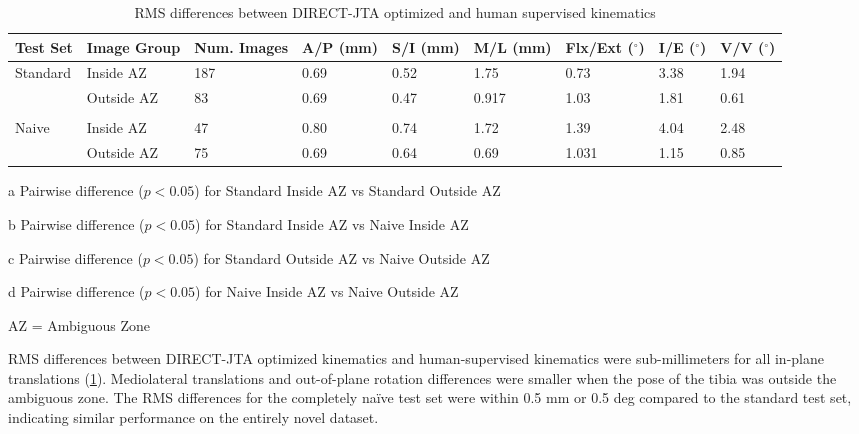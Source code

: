 {\begin{landscape}
	\begin{table}[h!]
		\centering
		\caption{RMS differences between DIRECT-JTA optimized and human supervised kinematics}
		\label{tab:direct-rms}
		\begin{threeparttable}
			\begin{tabularx}{\linewidth}{XXXXXXXXX}
				\hline
				Test Set                  & Image Group & Num. Images & A/P (mm) & S/I (mm)      & M/L (mm)      & Flx/Ext ($^{\circ}$) & I/E ($^{\circ}$) & V/V ($^{\circ}$) \\ %
				\hline
				\multirow{2}{*}{Standard} & Inside AZ   & 187         & 0.69     & 0.52\tnote{b} & 1.75\tnote{a} & 0.73\tnote{a}        & 3.38             & 1.94\tnote{a}    \\
				                          & Outside AZ  & 83          & 0.69     & 0.47\tnote{c} & 0.917         & 1.03                 & 1.81             & 0.61             \\ \\
				\multirow{2}{*}{Naive}    & Inside AZ   & 47          & 0.80     & 0.74          & 1.72          & 1.39                 & 4.04             & 2.48\tnote{d}    \\
				                          & Outside AZ  & 75          & 0.69     & 0.64          & 0.69          & 1.031                & 1.15             & 0.85             \\ \hline
			\end{tabularx}
			\begin{tablenotes}
				\footnotesize
				\item[a] Pairwise difference ($p<0.05$) for Standard Inside AZ vs Standard Outside AZ %
				\item[b] Pairwise difference ($p<0.05$) for Standard Inside AZ vs Naive Inside AZ
				\item[c] Pairwise difference ($p<0.05$) for Standard Outside AZ vs Naive Outside AZ
				\item[d] Pairwise difference ($p<0.05$) for Naive Inside AZ vs Naive Outside AZ

				AZ = Ambiguous Zone
			\end{tablenotes}
		\end{threeparttable}
	\end{table}
\end{landscape}


RMS differences between DIRECT-JTA optimized kinematics and human-supervised
kinematics were sub-millimeters for all in-plane translations
(\cref{tab:direct-rms}). Mediolateral translations and out-of-plane rotation
differences were smaller when the pose of the tibia was outside the ambiguous
zone. The RMS differences for the completely naïve test set were within 0.5 mm
or 0.5 deg compared to the standard test set, indicating similar performance on
the entirely novel dataset.

}
